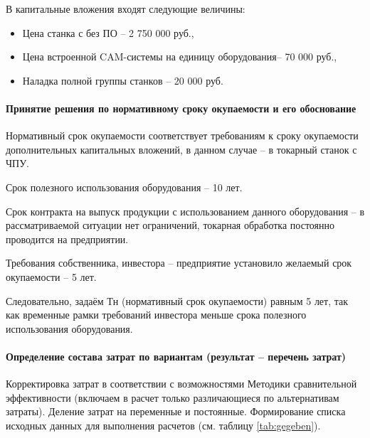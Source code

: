 В капитальные вложения входят следующие величины:

\begin{itemize}
	\item Цена станка с без ПО – 2 750 000 руб.,
	\item Цена встроенной CAM-системы на единицу оборудования– 70 000 руб.,
	\item Наладка полной группы станков – 20 000 руб.
\end{itemize}

\paragraph{Принятие решения по нормативному сроку окупаемости и его обоснование}
\nopagebreak

Нормативный срок окупаемости соответствует требованиям к сроку окупаемости дополнительных капитальных вложений, в данном случае – в токарный станок с ЧПУ.

Срок полезного использования оборудования – 10 лет.

Срок контракта на выпуск продукции с использованием данного оборудования – в рассматриваемой ситуации нет ограничений, токарная обработка постоянно проводится на предприятии.

Требования собственника, инвестора – предприятие установило желаемый срок окупаемости – 5 лет.

Следовательно, задаём Тн (нормативный срок окупаемости) равным 5 лет, так как временные рамки требований инвестора меньше срока полезного использования оборудования.

\paragraph{Определение состава затрат по вариантам (результат – перечень затрат)}
\nopagebreak

Корректировка затрат в соответствии с возможностями Методики сравнительной эффективности (включаем в расчет только различающиеся по альтернативам затраты). Деление затрат на переменные и постоянные. Формирование списка исходных данных для выполнения расчетов (см. таблицу \ref{tab:gegeben}).

